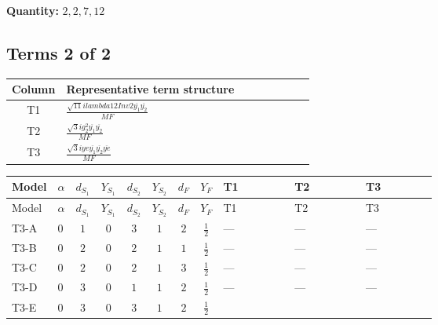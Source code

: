 \documentclass[8pt]{article}
\begin{document}
\begin{landscape}
\begin{longtable}{@{}llcccccc >{\raggedright\arraybackslash}p{0.21\linewidth} >{\raggedright\arraybackslash}p{0.21\linewidth} >{\raggedright\arraybackslash}p{0.21\linewidth}@{}}
\midrule
\bottomrule
\end{longtable}
\clearpage
\noindent\textbf{Quantity: }$\mathrm{2,2,7,12}$\par\smallskip
\subsection*{Terms 2 of 2}
\begin{center}
\begin{tabular}{@{}c >{\raggedright\arraybackslash}p{0.82\linewidth}@{}}
\toprule
Column & Representative term structure \\
\midrule
T1 & \(\displaystyle \frac{\sqrt{11} i lambda12Inv2 \overline{y_{1}} \overline{y_{2}}}{MF}\) \\
\midrule
T2 & \(\displaystyle \frac{\sqrt{3} i g_{2}^{2} \overline{y_{1}} \overline{y_{2}}}{MF}\) \\
\midrule
T3 & \(\displaystyle \frac{\sqrt{3} i ye \overline{y_{1}} \overline{y_{2}} \overline{ye}}{MF}\) \\
\midrule
\bottomrule
\end{tabular}
\end{center}
\smallskip
\tiny
\begin{longtable}{@{}llcccccc >{\raggedright\arraybackslash}p{0.21\linewidth} >{\raggedright\arraybackslash}p{0.21\linewidth} >{\raggedright\arraybackslash}p{0.21\linewidth}@{}}
\toprule
Model & $\alpha$ & $d_{S_1}$ & $Y_{S_1}$ & $d_{S_2}$ & $Y_{S_2}$ & $d_F$ & $Y_F$ & T1 & T2 & T3 \\
\midrule
\endfirsthead
\toprule
Model & $\alpha$ & $d_{S_1}$ & $Y_{S_1}$ & $d_{S_2}$ & $Y_{S_2}$ & $d_F$ & $Y_F$ & T1 & T2 & T3 \\
\midrule
\endhead
T3-A & $0$ & $1$ & $0$ & $3$ & $1$ & $2$ & $\frac{1}{2}$ & --- & --- & --- \\
\midrule
T3-B & $0$ & $2$ & $0$ & $2$ & $1$ & $1$ & $\frac{1}{2}$ & --- & --- & --- \\
\midrule
T3-C & $0$ & $2$ & $0$ & $2$ & $1$ & $3$ & $\frac{1}{2}$ & --- & --- & --- \\
\midrule
T3-D & $0$ & $3$ & $0$ & $1$ & $1$ & $2$ & $\frac{1}{2}$ & --- & --- & --- \\
\midrule
T3-E & $0$ & $3$ & $0$ & $3$ & $1$ & $2$ & $\frac{1}{2}$ & \scriptsize\adjustbox{max width=\linewidth}{$\begin{gathered} \frac{3 \sqrt{11} i lambda12Inv2 \overline{y_{1}} \overline{y_{2}}}{22 MF}\end{gathered}$} & \scriptsize\adjustbox{max width=\linewidth}{$\begin{gathered} \frac{11 \sqrt{3} i g_{2}^{2} \overline{y_{1}} \overline{y_{2}}}{8 MF}\end{gathered}$} & \scriptsize\adjustbox{max width=\linewidth}{$\begin{gathered} - \frac{\sqrt{3} i ye \overline{y_{1}} \overline{y_{2}} \overline{ye}}{12 MF}\end{gathered}$} \\
\midrule
\bottomrule
\end{longtable}
\clearpage

\end{landscape}
\end{document}
